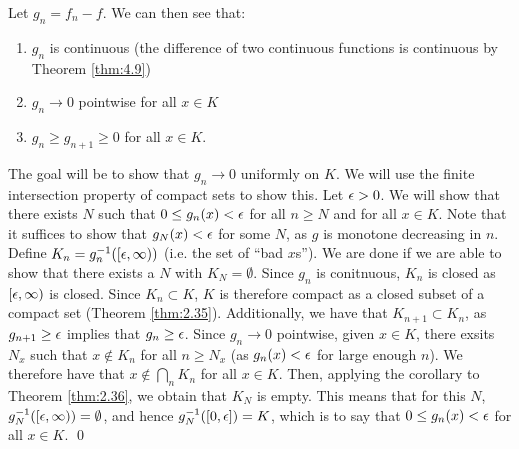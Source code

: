 \begin{nproof}
    Let $g_n = f_n - f$. We can then see that:
    \begin{enumerate}
        \item $g_n$ is continuous (the difference of two continuous functions is continuous by Theorem \ref{thm:4.9})
        \item $g_n \rightarrow 0$ pointwise for all $x \in K$
        \item $g_n \geq g_{n+1} \geq 0$ for all $x \in K$.
    \end{enumerate}
    The goal will be to show that $g_n \rightarrow 0$ uniformly on $K$. We will use the finite intersection property of compact sets to show this. Let $\epsilon > 0$. We will show that there exists $N$ such that $0 \leq g_n(x) < \epsilon$ for all $n \geq N$ and for all $x \in K$. Note that it suffices to show that $g_N(x) < \epsilon$ for some $N$, as $g$ is monotone decreasing in $n$. Define $K_n = g_{n}^{-1}([\epsilon, \infty))$ (i.e. the set of ``bad $x$s''). We are done if we are able to show that there exists a $N$ with $K_N = \emptyset$. Since $g_n$ is conitnuous, $K_n$ is closed as $[\epsilon, \infty)$ is closed. Since $K_n \subset K$, $K$ is therefore compact as a closed subset of a compact set (Theorem \ref{thm:2.35}). Additionally, we have that $K_{n+1} \subset K_n$, as $g_{n+1} \geq \epsilon$ implies that $g_n \geq \epsilon$. Since $g_n \rightarrow 0$ pointwise, given $x \in K$, there exsits $N_x$ such that $x \notin K_n$ for all $n \geq N_x$ (as $g_n(x) < \epsilon$ for large enough $n$). We therefore have that $x \notin \bigcap_n K_n$ for all $x \in K$. Then, applying the corollary to Theorem \ref{thm:2.36}, we obtain that $K_N$ is empty. This means that for this $N$, $g_N^{-1}([\epsilon, \infty)) = \emptyset$, and hence $g_N^{-1}([0, \epsilon]) = K$, which is to say that $0 \leq g_n(x) < \epsilon$ for all $x \in K$. \qed
\end{nproof}

